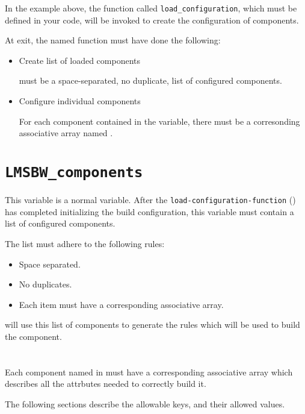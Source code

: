 In the example above, the function called
\texttt{load\_configuration}, which must be defined in your \makefile
code, will be invoked to create the configuration of components.

At exit, the named function must have done the following:

\begin{itemize}
\item Create list of loaded components

  \lmsbwcomponents must be a space-separated, no duplicate, list of
  configured components.
\item Configure individual components

  For each component contained in the \lmsbwcomponents variable, there
  must be a corresonding associative array named
  .

\end{itemize}

\section{\texttt{LMSBW\_components}}

This variable is a normal \make variable.  After the
\texttt{load-configuration-function}
() has completed initializing the
build configuration, this variable must contain a list of configured
components.

The list must adhere to the following rules:

\begin{itemize}
\item Space separated.
\item No duplicates.
\item Each item must have a corresponding 
  associative array.
\end{itemize}

\lmsbw will use this list of components to generate the rules which
will be used to build the component.

\section{}

Each component named in \lmsbwcomponents must have a corresponding
associative array which describes all the attrbutes needed to
correctly build it.

The following sections describe the allowable keys, and their allowed
values.

